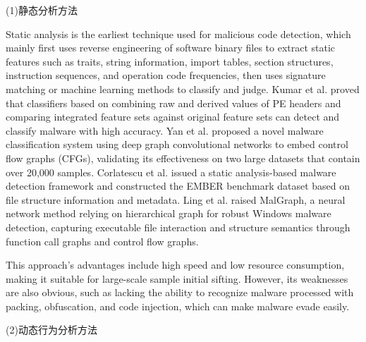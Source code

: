  
(1)静态分析方法

Static analysis is the earliest technique used for malicious code detection, which mainly first uses reverse engineering of software binary files to extract static features such as traits, string information, import tables, section structures, instruction sequences, and operation code frequencies, then uses signature matching or machine learning methods to classify and judge. Kumar et al. proved that classifiers based on combining raw and derived values of PE headers and comparing integrated feature sets against original feature sets can detect and classify malware with high accuracy\cite{kumar2019learning}. Yan et al. proposed a novel malware classification system using deep graph convolutional networks to embed control flow graphs (CFGs), validating its effectiveness on two large datasets that contain over 20,000 samples\cite{yan2019classifying}. Corlatescu et al. issued a static analysis-based malware detection framework and constructed the EMBER benchmark dataset based on file structure information and metadata\cite{corlatescu2023embersim}. Ling et al. raised MalGraph, a neural network method relying on hierarchical graph for robust Windows malware detection, capturing executable file interaction and structure semantics through function call graphs and control flow graphs\cite{ling2022malgraph}.

This approach's advantages include high speed and low resource consumption, making it suitable for large-scale sample initial sifting. However, its weaknesses are also obvious, such as lacking the ability to recognize malware processed with packing, obfuscation, and code injection, which can make malware evade easily.

(2)动态行为分析方法

